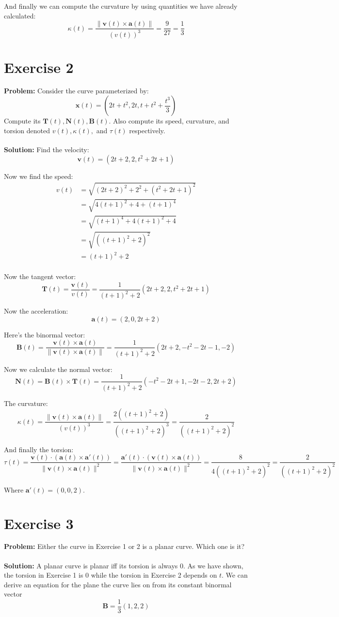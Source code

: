 \documentclass{article}
\begin{document}
And finally we can compute the curvature by using quantities we have already calculated:
$$\kappa(t)=\frac{\|\mathbf v(t)\times\mathbf a(t)\|}{(v(t))^3}=\frac{9}{27}=\frac{1}{3}$$

\section*{Exercise 2}
\textbf{Problem:} Consider the curve parameterized by:
$$\mathbf x(t)=\left(2t+t^2,2t,t+t^2+\frac{t^3}{3}\right)$$
Compute its $\mathbf T(t), \mathbf N(t), \mathbf B(t)$. Also compute its speed, curvature, and torsion denoted $v(t), \kappa(t),$ and $\tau(t)$ respectively.
\\\\
\textbf{Solution:} Find the velocity:
$$\mathbf v(t)=(2t+2,2,t^2+2t+1)$$

Now we find the speed:
\begin{align*}
v(t)&=\sqrt{(2t+2)^2+2^2+(t^2+2t+1)^2}\\
&=\sqrt{4(t+1)^2+4+(t+1)^4}\\
&=\sqrt{(t+1)^4+4(t+1)^2+4}\\
&=\sqrt{((t+1)^2+2)^2}\\
&=(t+1)^2+2\\
\end{align*}

Now the tangent vector:
$$\mathbf T(t)=\frac{\mathbf v(t)}{v(t)}=\frac{1}{(t+1)^2+2}(2t+2,2,t^2+2t+1)$$

Now the acceleration:
$$\mathbf a(t)=(2,0,2t+2)$$

Here's the binormal vector:
$$\mathbf B(t)=\frac{\mathbf v(t)\times\mathbf a(t)}{\|\mathbf v(t)\times\mathbf a(t)\|}=\frac{1}{(t+1)^2+2}(2t+2,-t^2-2t-1,-2)$$

Now we calculate the normal vector:
$$\mathbf N(t)=\mathbf B(t)\times\mathbf T(t)=\frac{1}{(t+1)^2+2}(-t^2-2t+1,-2t-2,2t+2)$$

The curvature:
$$\kappa(t)=\frac{\|\mathbf v(t)\times\mathbf a(t)\|}{(v(t))^3}=\frac{2((t+1)^2+2)}{((t+1)^2+2)^3}=\frac{2}{((t+1)^2+2)^2}$$

And finally the torsion:
$$\tau(t)=\frac{\mathbf v(t)\cdot(\mathbf a(t)\times\mathbf a'(t))}{\|\mathbf v(t)\times\mathbf a(t)\|^2}=\frac{\mathbf a'(t)\cdot(\mathbf v(t)\times\mathbf a(t))}{\|\mathbf v(t)\times\mathbf a(t)\|^2}=\frac{8}{4((t+1)^2+2)^2}=\frac{2}{((t+1)^2+2)^2}$$

Where $\mathbf a'(t)=(0,0,2)$.

\section*{Exercise 3}
\textbf{Problem:} Either the curve in Exercise 1 or 2 is a planar curve. Which one is it?
\\\\
\textbf{Solution:} A planar curve is planar iff its torsion is always 0. As we have shown, the torsion in Exercise 1 is 0 while the torsion in Exercise 2 depends on $t$. We can derive an equation for the plane the curve lies on from its constant binormal vector
$$\mathbf B=\frac{1}{3}(1,2,2)$$
\end{document}

